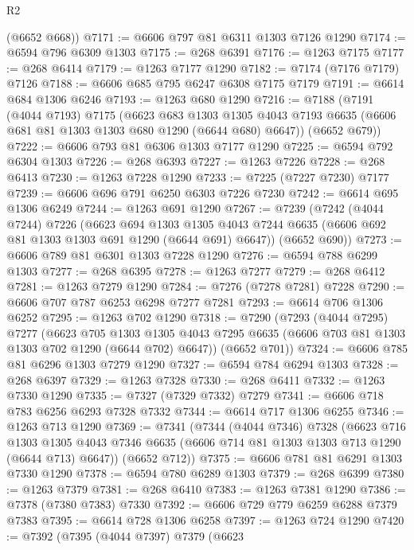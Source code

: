 \begin{lexlean}{R2}
\begin{coremodule}
      (@6652 @668))
@7171 := @6606 @797 @81 @6311 @1303 @7126 @1290
@7174 := @6594 @796 @6309 @1303
@7175 := @268 @6391
@7176 := @1263 @7175
@7177 := @268 @6414
@7179 := @1263 @7177 @1290
@7182 := @7174 (@7176 @7179) @7126
@7188 := @6606 @685 @795 @6247 @6308 @7175 @7179
@7191 := @6614 @684 @1306 @6246
@7193 := @1263 @680 @1290
@7216 := @7188
    (@7191
      (@4044 @7193)
      @7175
      (@6623
        @683
        @1303
        @1305
        @4043
        @7193
        @6635
        (@6606 @681 @81 @1303 @1303 @680 @1290 (@6644 @680) @6647))
      (@6652 @679))
@7222 := @6606 @793 @81 @6306 @1303 @7177 @1290
@7225 := @6594 @792 @6304 @1303
@7226 := @268 @6393
@7227 := @1263 @7226
@7228 := @268 @6413
@7230 := @1263 @7228 @1290
@7233 := @7225 (@7227 @7230) @7177
@7239 := @6606 @696 @791 @6250 @6303 @7226 @7230
@7242 := @6614 @695 @1306 @6249
@7244 := @1263 @691 @1290
@7267 := @7239
    (@7242
      (@4044 @7244)
      @7226
      (@6623
        @694
        @1303
        @1305
        @4043
        @7244
        @6635
        (@6606 @692 @81 @1303 @1303 @691 @1290 (@6644 @691) @6647))
      (@6652 @690))
@7273 := @6606 @789 @81 @6301 @1303 @7228 @1290
@7276 := @6594 @788 @6299 @1303
@7277 := @268 @6395
@7278 := @1263 @7277
@7279 := @268 @6412
@7281 := @1263 @7279 @1290
@7284 := @7276 (@7278 @7281) @7228
@7290 := @6606 @707 @787 @6253 @6298 @7277 @7281
@7293 := @6614 @706 @1306 @6252
@7295 := @1263 @702 @1290
@7318 := @7290
    (@7293
      (@4044 @7295)
      @7277
      (@6623
        @705
        @1303
        @1305
        @4043
        @7295
        @6635
        (@6606 @703 @81 @1303 @1303 @702 @1290 (@6644 @702) @6647))
      (@6652 @701))
@7324 := @6606 @785 @81 @6296 @1303 @7279 @1290
@7327 := @6594 @784 @6294 @1303
@7328 := @268 @6397
@7329 := @1263 @7328
@7330 := @268 @6411
@7332 := @1263 @7330 @1290
@7335 := @7327 (@7329 @7332) @7279
@7341 := @6606 @718 @783 @6256 @6293 @7328 @7332
@7344 := @6614 @717 @1306 @6255
@7346 := @1263 @713 @1290
@7369 := @7341
    (@7344
      (@4044 @7346)
      @7328
      (@6623
        @716
        @1303
        @1305
        @4043
        @7346
        @6635
        (@6606 @714 @81 @1303 @1303 @713 @1290 (@6644 @713) @6647))
      (@6652 @712))
@7375 := @6606 @781 @81 @6291 @1303 @7330 @1290
@7378 := @6594 @780 @6289 @1303
@7379 := @268 @6399
@7380 := @1263 @7379
@7381 := @268 @6410
@7383 := @1263 @7381 @1290
@7386 := @7378 (@7380 @7383) @7330
@7392 := @6606 @729 @779 @6259 @6288 @7379 @7383
@7395 := @6614 @728 @1306 @6258
@7397 := @1263 @724 @1290
@7420 := @7392
    (@7395
      (@4044 @7397)
      @7379
      (@6623

\end{coremodule}
\end{lexlean}

